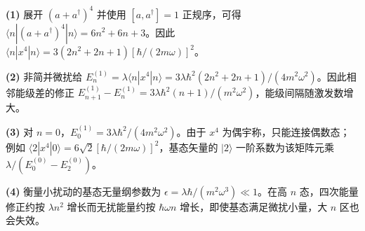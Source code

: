 \par\noindent\textbf{(1)} 展开 \((a+a^\dagger)^4\) 并使用 \([a,a^\dagger]=1\) 正规序，可得 \(\langle n|(a+a^\dagger)^4|n\rangle=6n^2+6n+3\)。因此 \(\langle n|x^4|n\rangle=3(2n^2+2n+1)[\hbar/(2m\omega)]^2\)。
\par\noindent\textbf{(2)} 非简并微扰给 \(E_n^{(1)}=\lambda\langle n|x^4|n\rangle=3\lambda\hbar^2(2n^2+2n+1)/(4m^2\omega^2)\)。因此相邻能级差的修正 \(E_{n+1}^{(1)}-E_n^{(1)}=3\lambda\hbar^2(n+1)/(m^2\omega^2)\)，能级间隔随激发数增大。
\par\noindent\textbf{(3)} 对 \(n=0\)，\(E_0^{(1)}=3\lambda\hbar^2/(4m^2\omega^2)\)。由于 \(x^4\) 为偶宇称，只能连接偶数态；例如 \(\langle2|x^4|0\rangle=6\sqrt2[\hbar/(2m\omega)]^2\)，基态矢量的 \(|2\rangle\) 一阶系数为该矩阵元乘 \(\lambda/(E_0^{(0)}-E_2^{(0)})\)。
\par\noindent\textbf{(4)} 衡量小扰动的基态无量纲参数为 \(\epsilon=\lambda\hbar/(m^2\omega^3)\ll1\)。在高 \(n\) 态，四次能量修正约按 \(\lambda n^2\) 增长而无扰能量约按 \(\hbar\omega n\) 增长，即使基态满足微扰小量，大 \(n\) 区也会失效。
